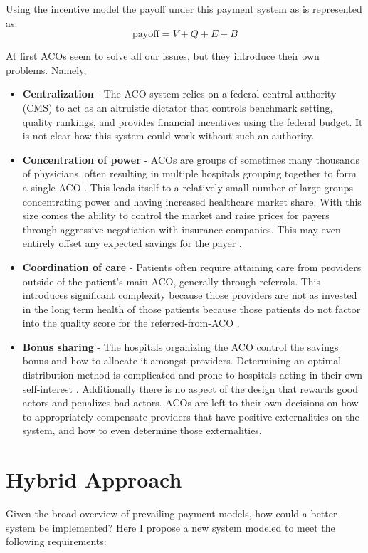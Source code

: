 \documentclass{article}
\begin{document}
Using the incentive model the payoff under this payment system as is represented as:
\begin{equation}
    \text{payoff} = V + Q + E + B
\end{equation}

At first ACOs seem to solve all our issues, but they introduce their own problems. Namely,
\begin{itemize}
    \item \textbf{Centralization} - The ACO system relies on a federal central authority (CMS) to act as an altruistic dictator that controls benchmark setting, quality rankings, and provides financial incentives using the federal budget. It is not clear how this system could work without such an authority.
    \item \textbf{Concentration of power} - ACOs are groups of sometimes many thousands of physicians, often resulting in multiple hospitals grouping together to form a single ACO \cite{acoethics}. This leads itself to a relatively small number of large groups concentrating power and having increased healthcare market share. With this size comes the ability to control the market and raise prices for payers through aggressive negotiation with insurance companies. This may even entirely offset any expected savings for the payer \cite{acoecon}.
    \item \textbf{Coordination of care} - Patients often require attaining care from providers outside of the patient's main ACO, generally through referrals. This introduces significant complexity because those providers are not as invested in the long term health of those patients because those patients do not factor into the quality score for the referred-from-ACO \cite{acoecon}.
    \item \textbf{Bonus sharing} - The hospitals organizing the ACO control the savings bonus and how to allocate it amongst providers. Determining an optimal distribution method is complicated and prone to hospitals acting in their own self-interest \cite{inflation}. Additionally there is no aspect of the design that rewards good actors and penalizes bad actors. ACOs are left to their own decisions on how to appropriately compensate providers that have positive externalities on the system, and how to even determine those externalities.
\end{itemize}

\section{Hybrid Approach} \label{sec:reqs}
Given the broad overview of prevailing payment models, how could a better system be implemented? Here I propose a new system modeled to meet the following requirements:
\end{document}
